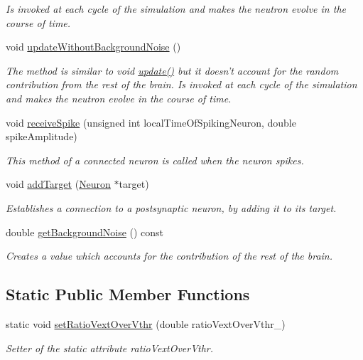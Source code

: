\begin{DoxyCompactItemize}
\begin{DoxyCompactList}\small\item\em Is invoked at each cycle of the simulation and makes the neutron evolve in the course of time. \end{DoxyCompactList}\item 
void \hyperlink{classNeuron_ababbaa5bc5f7b2e00e0ae5ffcc8fbfdb}{update\-Without\-Background\-Noise} ()
\begin{DoxyCompactList}\small\item\em The method is similar to void \hyperlink{classNeuron_a782b3b728eee5097ab205a7a7990225b}{update()} but it doesn't account for the random contribution from the rest of the brain. Is invoked at each cycle of the simulation and makes the neutron evolve in the course of time. \end{DoxyCompactList}\item 
void \hyperlink{classNeuron_aa8111a347de6ddfb6c799bdcd3092cb7}{receive\-Spike} (unsigned int local\-Time\-Of\-Spiking\-Neuron, double spike\-Amplitude)
\begin{DoxyCompactList}\small\item\em This method of a connected neuron is called when the neuron spikes. \end{DoxyCompactList}\item 
void \hyperlink{classNeuron_a9bf071c800e76fa7fbd611cee7cd76d6}{add\-Target} (\hyperlink{classNeuron}{Neuron} $\ast$target)
\begin{DoxyCompactList}\small\item\em Establishes a connection to a postsynaptic neuron, by adding it to its target. \end{DoxyCompactList}\item 
double \hyperlink{classNeuron_a5487631e8982ae2368da0917535a9001}{get\-Background\-Noise} () const 
\begin{DoxyCompactList}\small\item\em Creates a value which accounts for the contribution of the rest of the brain. \end{DoxyCompactList}\end{DoxyCompactItemize}
\subsection*{Static Public Member Functions}
\begin{DoxyCompactItemize}
\item 
static void \hyperlink{classNeuron_ac1a73d639befdae8610674bb66c15831}{set\-Ratio\-Vext\-Over\-Vthr} (double ratio\-Vext\-Over\-Vthr\-\_\-)
\begin{DoxyCompactList}\small\item\em Setter of the static attribute ratio\-Vext\-Over\-Vthr. \end{DoxyCompactList}\end{DoxyCompactItemize}
